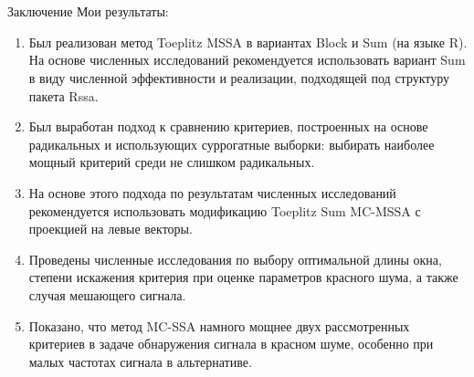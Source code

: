 \documentclass[pdf,notheorems,10pt,intlimits, unicode]{beamer}
\begin{document}
\section{}
\begin{frame}{Заключение}
  Мои результаты:
	\begin{enumerate}
		\item Был реализован метод Toeplitz MSSA в вариантах Block и Sum (на языке \textsf{R}). На основе численных исследований рекомендуется использовать вариант Sum в виду численной эффективности и реализации, подходящей под структуру пакета \textsf{Rssa}.
		\item Был выработан подход к сравнению критериев, построенных на основе радикальных и использующих суррогатные выборки: выбирать наиболее мощный критерий среди не слишком радикальных.
		\item На основе этого подхода по результатам численных исследований рекомендуется использовать модификацию Toeplitz Sum MC-MSSA с проекцией на левые векторы.
    \item Проведены численные исследования по выбору оптимальной длины окна, степени искажения критерия при оценке параметров красного шума, а также случая мешающего сигнала.
    \item Показано, что метод MC-SSA намного мощнее двух рассмотренных критериев в задаче обнаружения сигнала в красном шуме, особенно при малых частотах сигнала в альтернативе.
  \end{enumerate}
\end{frame}
\end{document}
